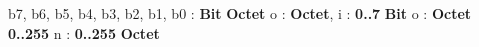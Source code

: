 \begin{algorithme}
    {b7, b6, b5, b4, b3, b2, b1, b0 : \textbf{Bit}}
    {\textbf{Octet}}
    {}
    {o : \textbf{Octet}, i : \textbf{0..7}}
    {\textbf{Bit}}
    {}
    {o : \textbf{Octet}}
    {\textbf{0..255}}
    {}
    {n : \textbf{0..255}}
    {\textbf{Octet}}
    {}
\end{algorithme}
